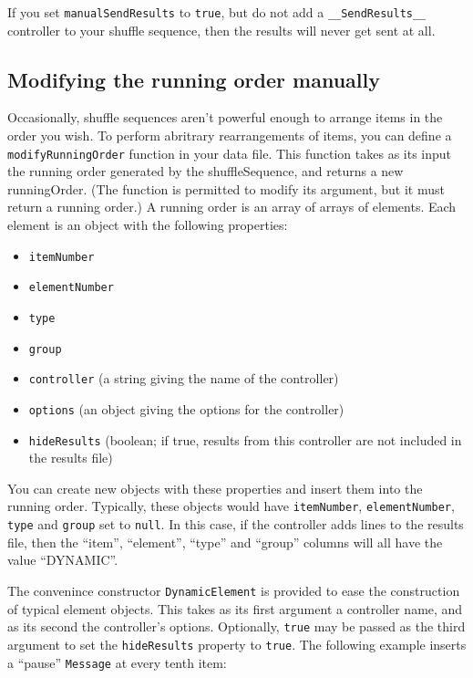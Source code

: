\documentclass[]{article}
\begin{document}
If you set \texttt{manualSendResults} to \texttt{true}, but do not add a
\texttt{\_\_SendResults\_\_} controller to your shuffle sequence, then
the results will never get sent at all.

\subsection{Modifying the running order
manually}\label{modifying-the-running-order-manually}

Occasionally, shuffle sequences aren't powerful enough to arrange items
in the order you wish. To perform abritrary rearrangements of items, you
can define a \texttt{modifyRunningOrder} function in your data file.
This function takes as its input the running order generated by the
shuffleSequence, and returns a new runningOrder. (The function is
permitted to modify its argument, but it must return a running order.) A
running order is an array of arrays of elements. Each element is an
object with the following properties:

\begin{itemize}
\itemsep1pt\parskip0pt
\item
  \texttt{itemNumber}
\item
  \texttt{elementNumber}
\item
  \texttt{type}
\item
  \texttt{group}
\item
  \texttt{controller} (a string giving the name of the controller)
\item
  \texttt{options} (an object giving the options for the controller)
\item
  \texttt{hideResults} (boolean; if true, results from this controller
  are not included in the results file)
\end{itemize}

You can create new objects with these properties and insert them into
the running order. Typically, these objects would have
\texttt{itemNumber}, \texttt{elementNumber}, \texttt{type} and
\texttt{group} set to \texttt{null}. In this case, if the controller
adds lines to the results file, then the ``item'', ``element'', ``type''
and ``group'' columns will all have the value ``DYNAMIC''.

The convenince constructor \texttt{DynamicElement} is provided to ease
the construction of typical element objects. This takes as its first
argument a controller name, and as its second the controller's options.
Optionally, \texttt{true} may be passed as the third argument to set the
\texttt{hideResults} property to \texttt{true}. The following example
inserts a ``pause'' \texttt{Message} at every tenth item:
\end{document}
